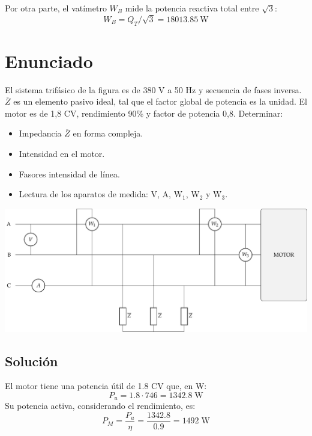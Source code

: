 Por otra parte, el vatímetro $W_B$ mide la potencia reactiva total entre $\sqrt{3}$:
\begin{equation*}
  W_B = Q_T/\sqrt{3}=\qty{18013.85}{\watt}
\end{equation*}



\section{Enunciado}
 
El sistema trifásico de la figura es de 380 V a 50 Hz y secuencia de fases inversa. $\overline{Z}$ es un elemento pasivo ideal, tal que el factor global de potencia es la unidad. El motor es de 1,8 CV, rendimiento 90\% y factor de potencia 0,8. Determinar:
\begin{itemize}
    \item  Impedancia $\overline{Z}$ en forma compleja.
    \item  Intensidad en el motor.
    \item  Fasores intensidad de línea.
    \item  Lectura de los aparatos de medida: V, A, W$_1$, W$_2$ y W$_3$.
\end{itemize}
\begin{center}
  \includegraphics[width=\linewidth]{figuras/ej7_BT3.pdf}
\end{center}

\subsection*{Solución}
El motor tiene una potencia útil de 1.8 CV que, en W:
\begin{equation*}
  P_u=1.8\cdot 746=1342.8\;\text{W}    
\end{equation*}
Su potencia activa, considerando el rendimiento, es:
\begin{equation*}
  P_M=\dfrac{P_u}{\eta}=\dfrac{1342.8}{0.9}=1492\;\text{W}
\end{equation*} 


